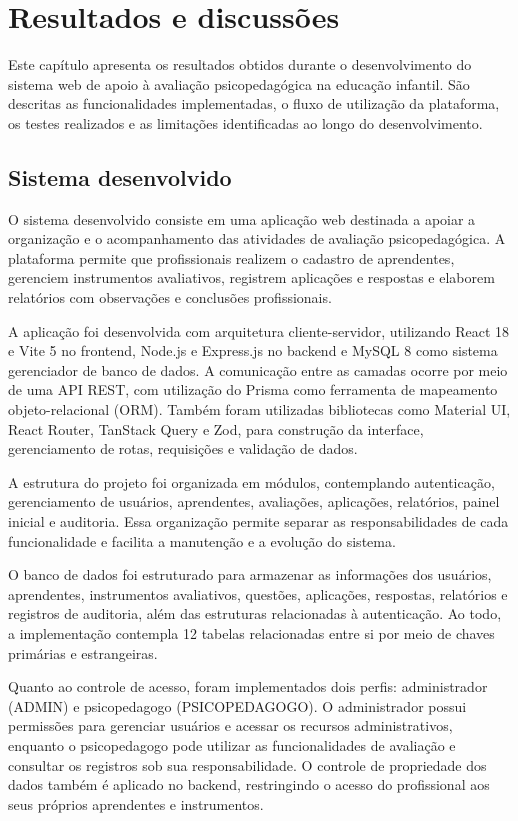 \chapter[Resultados e discussões]{Resultados e discussões} \label{capitulo15}

Este capítulo apresenta os resultados obtidos durante o desenvolvimento do sistema web de apoio à avaliação psicopedagógica na educação infantil. São descritas as funcionalidades implementadas, o fluxo de utilização da plataforma, os testes realizados e as limitações identificadas ao longo do desenvolvimento.

\section{Sistema desenvolvido}

O sistema desenvolvido consiste em uma aplicação web destinada a apoiar a organização e o acompanhamento das atividades de avaliação psicopedagógica. A plataforma permite que profissionais realizem o cadastro de aprendentes, gerenciem instrumentos avaliativos, registrem aplicações e respostas e elaborem relatórios com observações e conclusões profissionais.

A aplicação foi desenvolvida com arquitetura cliente-servidor, utilizando React 18 e Vite 5 no frontend, Node.js e Express.js no backend e MySQL 8 como sistema gerenciador de banco de dados. A comunicação entre as camadas ocorre por meio de uma API REST, com utilização do Prisma como ferramenta de mapeamento objeto-relacional (ORM). Também foram utilizadas bibliotecas como Material UI, React Router, TanStack Query e Zod, para construção da interface, gerenciamento de rotas, requisições e validação de dados.

A estrutura do projeto foi organizada em módulos, contemplando autenticação, gerenciamento de usuários, aprendentes, avaliações, aplicações, relatórios, painel inicial e auditoria. Essa organização permite separar as responsabilidades de cada funcionalidade e facilita a manutenção e a evolução do sistema.

O banco de dados foi estruturado para armazenar as informações dos usuários, aprendentes, instrumentos avaliativos, questões, aplicações, respostas, relatórios e registros de auditoria, além das estruturas relacionadas à autenticação. Ao todo, a implementação contempla 12 tabelas relacionadas entre si por meio de chaves primárias e estrangeiras.

Quanto ao controle de acesso, foram implementados dois perfis: administrador (ADMIN) e psicopedagogo (PSICOPEDAGOGO). O administrador possui permissões para gerenciar usuários e acessar os recursos administrativos, enquanto o psicopedagogo pode utilizar as funcionalidades de avaliação e consultar os registros sob sua responsabilidade. O controle de propriedade dos dados também é aplicado no backend, restringindo o acesso do profissional aos seus próprios aprendentes e instrumentos.

